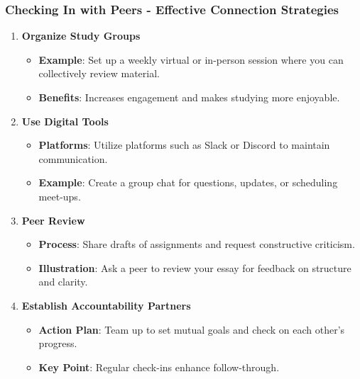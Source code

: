 \documentclass[aspectratio=169]{beamer}
\begin{document}
\begin{frame}[fragile]
    \frametitle{Checking In with Peers - Effective Connection Strategies}
    \begin{enumerate}
        \item \textbf{Organize Study Groups}
            \begin{itemize}
                \item \textbf{Example}: Set up a weekly virtual or in-person session where you can collectively review material.
                \item \textbf{Benefits}: Increases engagement and makes studying more enjoyable.
            \end{itemize}
        \item \textbf{Use Digital Tools}
            \begin{itemize}
                \item \textbf{Platforms}: Utilize platforms such as Slack or Discord to maintain communication.
                \item \textbf{Example}: Create a group chat for questions, updates, or scheduling meet-ups.
            \end{itemize}
        \item \textbf{Peer Review}
            \begin{itemize}
                \item \textbf{Process}: Share drafts of assignments and request constructive criticism.
                \item \textbf{Illustration}: Ask a peer to review your essay for feedback on structure and clarity.
            \end{itemize}
        \item \textbf{Establish Accountability Partners}
            \begin{itemize}
                \item \textbf{Action Plan}: Team up to set mutual goals and check on each other’s progress.
                \item \textbf{Key Point}: Regular check-ins enhance follow-through.
            \end{itemize}
    \end{enumerate}
\end{frame}
\end{document}
